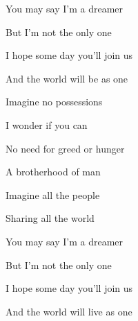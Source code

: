 \begin{song}
\bigskip

 You may say I'm a dreamer  \par
{} But I'm not the only one   \par
{} I hope some day you'll join us  \par
{} And the world will be as one \par

\bigskip

 Imagine no possessions \par
{} I wonder if you   can  \par
{} No need for greed or hunger \par
{} A brotherhood of man \par

\bigskip

 Imagine all the people  \par
{}Sharing all the world \par

\bigskip

 You may say I'm a dreamer  \par
{} But I'm not the only one   \par
{} I hope some day you'll join us  \par
{} And the world will live as one \par

\end{song}
